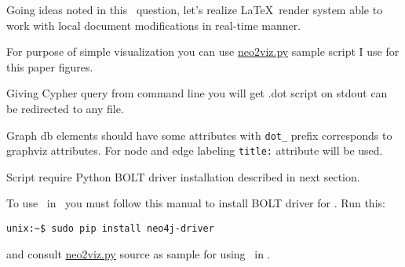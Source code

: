 \secdown 
{}

\label{dynatex}

Going ideas noted in this \so\ question, let's realize \LaTeX\ render system
able to work with local document modifications in real-time manner.


For purpose of simple visualization you can use
\href{https://github.com/ponyatov/article/raw/master/neo2viz.py}{neo2viz.py}
sample script I use for this paper figures.

Giving Cypher query from command line you will get .dot script on stdout can be
 redirected to any file.
 
Graph db elements should have some attributes with \verb|dot_| prefix
corresponds to graphviz attributes.
For node and edge labeling \verb|title:| attribute will be used.

Script require Python BOLT driver installation described in next section.


To use \neo\ in \py\ you must follow this manual to install BOLT driver for
\py. Run this:

\begin{verbatim}
unix:~$ sudo pip install neo4j-driver
\end{verbatim}

and consult
\href{https://github.com/ponyatov/article/raw/master/neo2viz.py}{neo2viz.py}
source as sample for using \neo\ in \py.

\secup